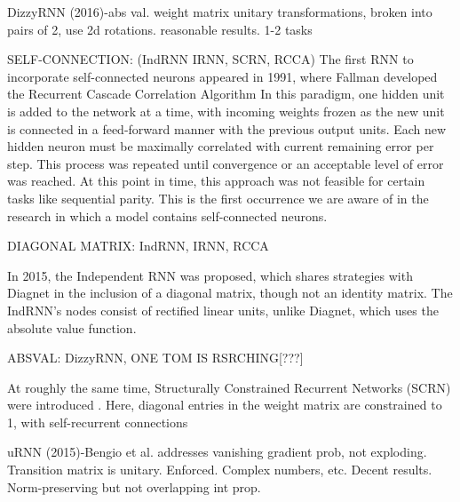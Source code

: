 \documentclass{article}
\begin{document}


DizzyRNN (2016)-abs val. weight matrix unitary transformations, broken into pairs of 2, use 2d rotations. reasonable results. 1-2 tasks 


SELF-CONNECTION: (IndRNN IRNN, SCRN, RCCA) 
The first RNN to incorporate self-connected neurons appeared in 1991, where Fallman developed the Recurrent Cascade Correlation Algorithm \citet{Fahlman1990TheRC}  In this paradigm, one hidden unit is added to the network at a time, with incoming weights frozen as the new unit is connected in a feed-forward manner with the previous output units. Each new hidden neuron must be maximally correlated with current remaining error per step.  This process was repeated until convergence or an acceptable level of error was reached.  At this point in time, this approach was not feasible for certain tasks like sequential parity.  This is the first occurrence we are aware of in the research in which a model contains self-connected neurons.  

DIAGONAL MATRIX: IndRNN, IRNN, RCCA

In 2015, the Independent RNN \citet{DBLP:journals/corr/LeJH15} was proposed, which shares strategies with Diagnet in the inclusion of a diagonal matrix, though not an identity matrix. The IndRNN's nodes consist of rectified linear units, unlike Diagnet, which uses the absolute value function.

ABSVAL: DizzyRNN, ONE TOM IS RSRCHING[???]

At roughly the same time, Structurally Constrained Recurrent Networks (SCRN) were introduced \citet{DBLP:journals/corr/MikolovJCMR14}. Here, diagonal entries in the weight matrix are constrained to 1, with self-recurrent connections

uRNN (2015)-Bengio et al.  addresses vanishing gradient prob, not exploding.  Transition matrix is unitary.  Enforced.  Complex numbers, etc. Decent results. Norm-preserving but not overlapping int prop.
\end{document}
